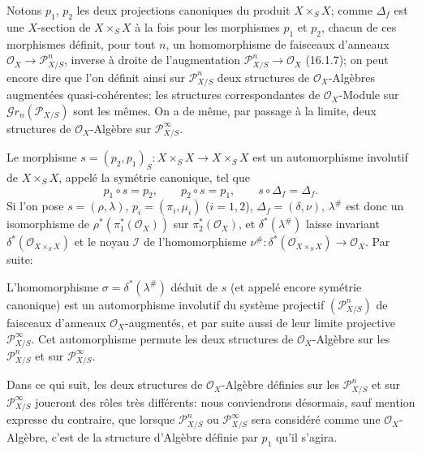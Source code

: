 \begin{env}[16.3.2]
\label{IV.16.3.2}
Notons $p_1$, $p_2$ les deux projections canoniques du produit $X\times_S X$;
comme $\Delta_f$ est une $X$-section de $X\times_S X$ à la fois pour les
morphismes $p_1$ et $p_2$, chacun de ces morphismes définit, pour tout $n$, un
homomorphisme de faisceaux d'anneaux $\mathcal{O}_X\to\mathscr{P}_{X/S}^n$,
inverse à droite de l'augmentation $\mathscr{P}_{X/S}^n\to\mathcal{O}_X$
(16.1.7); on peut encore dire que l'on définit ainsi sur
$\mathscr{P}_{X/S}^n$ deux structures de $\mathcal{O}_X$-Algèbres augmentées
quasi-cohérentes; les structures correspondantes de $\mathcal{O}_X$-Module sur
$\mathscr{G}r_n(\mathscr{P}_{X/S})$ sont les mêmes. On a de même, par passage à
la limite, deux structures de $\mathcal{O}_X$-Algèbre sur
$\mathscr{P}_{X/S}^\infty$.
\end{env}

\begin{env}[16.3.3]
Le morphisme $s=(p_2,p_1)_S:X\times_S X\to X\times_S X$ est un automorphisme
involutif de $X\times_S X$, appelé la symétrie canonique, tel que
\[
  p_1\circ s=p_2,\qquad p_2\circ s=p_1,\qquad s\circ\Delta_f=\Delta_f.
  \tag{16.3.3.1}
  \label{IV.16.3.3.1}
\]
Si l'on pose $s=(\rho,\lambda)$, $p_i=(\pi_i,\mu_i)$ ($i=1,2$),
$\Delta_f=(\delta,\nu)$, $\lambda^\#$ est donc un isomorphisme de
$\rho^*(\pi_1^*(\mathcal{O}_X))$ sur $\pi_2^*(\mathcal{O}_X)$, et
$\delta^*(\lambda^\#)$ laisse invariant $\delta^*(\mathcal{O}_{X\times_S X})$
et le noyau $\mathscr{I}$ de l'homomorphisme
$\nu^\#:\delta^*(\mathcal{O}_{X\times_S X})\to\mathcal{O}_X$. Par suite:
\end{env}

\begin{proposition}[16.3.4]
L'homomorphisme $\sigma=\delta^*(\lambda^\#)$ déduit de $s$ (et appelé encore
symétrie canonique) est un automorphisme involutif du système projectif
$(\mathscr{P}_{X/S}^n)$ de faisceaux
d'anneaux $\mathcal{O}_X$-augmentés, et par suite aussi de leur limite projective
$\mathscr{P}_{X/S}^\infty$. Cet automorphisme permute les deux structures de
$\mathcal{O}_X$-Algèbre sur les $\mathscr{P}_{X/S}^n$ et sur
$\mathscr{P}_{X/S}^\infty$.
\end{proposition}

\begin{env}[16.3.5]
\label{IV.16.3.5}
Dans ce qui suit, les deux structures de $\mathcal{O}_X$-Algèbre définies sur les
$\mathscr{P}_{X/S}^n$ et sur $\mathscr{P}_{X/S}^\infty$ joueront des rôles très
différents: nous conviendrons désormais, sauf mention expresse du contraire,
que lorsque $\mathscr{P}_{X/S}^n$ ou $\mathscr{P}_{X/S}^\infty$ sera considéré
comme une $\mathcal{O}_X$-Algèbre, c'est de la structure d'Algèbre définie par
$p_1$ qu'il s'agira.
\end{env}

